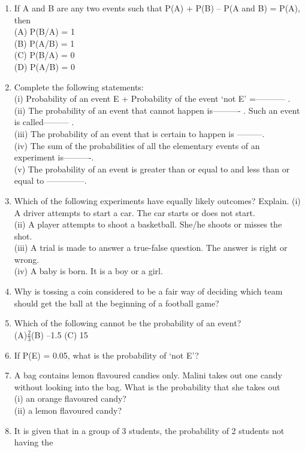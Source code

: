 \begin{enumerate}[label=\arabic*.,ref=\thesubsection.\theenumi]
\item If A and B are any two events such that P(A) + P(B) – P(A and B) = P(A), then\\
(A) P(B/A) = 1 \\
(B) P(A/B) = 1\\
(C) P(B/A) = 0 \\
(D) P(A/B) = 0\\
\item Complete the following statements:\\
 (i) Probability of an event E + Probability of the event ‘not E’ =----------- .\\
 (ii) The probability of an event that cannot happen is---------- . Such an event is called--------- .\\
 (iii) The probability of an event that is certain to happen is ---------.\\
 (iv) The sum of the probabilities of all the elementary events of an experiment is----------.\\ (v) The probability of an event is greater than or equal to and less than or equal to --------------.\\
\item Which of the following experiments have equally likely outcomes? Explain.
 (i) A driver attempts to start a car. The car starts or does not start.\\
 (ii) A player attempts to shoot a basketball. She/he shoots or misses the shot.\\
 (iii) A trial is made to answer a true-false question. The answer is right or wrong.\\
 (iv) A baby is born. It is a boy or a girl.\\
 \item Why is tossing a coin considered to be a fair way of deciding which team should get the
ball at the beginning of a football game?
\item Which of the following cannot be the probability of an event?\\
(A)$\frac{2}{3}$(B) –1.5 (C) 15%
\item If P(E) = 0.05, what is the probability of ‘not E’?
\item A bag contains lemon flavoured candies only. Malini takes out one candy without
looking into the bag. What is the probability that she takes out\\
(i) an orange flavoured candy?\\
(ii) a lemon flavoured candy?
\item It is given that in a group of 3 students, the probability of 2 students not having the

\end{enumerate}

